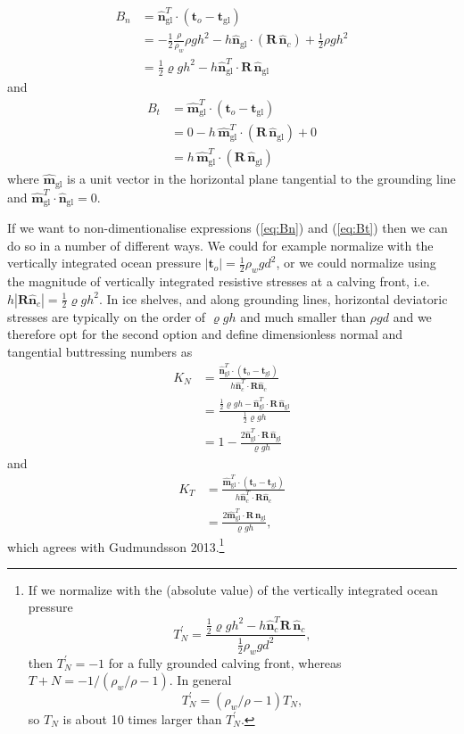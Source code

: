 \documentclass[10pt,a4paper]{book}
\newcommand{\ngl}{\hat{\bm{n}}_{\mathrm{gl}}}
\newcommand{\mgl}{\hat{\bm{m}}_{\mathrm{gl}}}
\newcommand{\normalc}{\hat{\bm{n}}_{c}}
\newcommand{\tgl}{\bm{t}_{\mathrm{gl}}}
\newcommand{\tO}{\bm{t}_o}
\begin{document}
\begin{align}
B_n &= \ngl^T \cdot ( \bm{t}_o - \tgl )\\
&= - \frac{1}{2} \frac{\rho}{\rho_w} \rho g h^2 -  h \ngl \cdot (\bm{R} \, \normalc) + \frac{1}{2} \rho g h^2\\
&=\frac{1}{2} \varrho g h^2 - h \ngl^T \cdot \bm{R} \, \ngl \label{eq:Bn}
\end{align}
and
\begin{align}
B_t &= \mgl^T \cdot ( \bm{t}_o - \tgl )\\
&= 0 -  h\,  \mgl^T \cdot (\bm{R} \, \ngl) + 0\\
&=h \, \mgl^T \cdot (\bm{R} \, \ngl) \label{eq:Bt}
\end{align}
where $\mgl$ is a unit vector in the horizontal plane tangential to
the grounding line and $\mgl^T \cdot \ngl=0$.


If we want to non-dimentionalise expressions (\ref{eq:Bn}) and
(\ref{eq:Bt}) then we can do so in a number of different ways. We
could for example normalize with the vertically integrated ocean
pressure $|\tO|=\frac{1}{2} \rho_w g d^2$, or we could normalize using
the magnitude of vertically integrated resistive stresses at a calving front, i.e.\ $h
|\bm{R} \normalc|=\frac{1}{2} \varrho g h^2$. In ice shelves, and along
grounding lines, horizontal deviatoric stresses are typically on the
order of $\varrho g h$ and much smaller than $\rho g d$ and we
therefore opt for the second option and define dimensionless normal and
tangential buttressing numbers as
\begin{align}
  K_N&=\frac{\ngl^T \cdot (\tO-\tgl)}{h \normalc^T \cdot \bm{R} \normalc} \\
  &=\frac{\frac{1}{2} \varrho g h -  \ngl^T \cdot \bm{R} \, \ngl}{\frac{1}{2} \varrho g h }\\
   &=1- \frac{2 \ngl^T \cdot \bm{R} \, \ngl}{\varrho g h }
\end{align}
and
\begin{align}
  K_T&=\frac{\mgl^T \cdot ( \bm{t}_o - \tgl )}{h \normalc^T \cdot \bm{R} \normalc} \\
     &=\frac{2 \mgl^T \cdot \bm{R} \, \ngl }{\varrho g h} ,
\end{align}
which agrees with Gudmundsson 2013.\footnote{If we normalize with the
  (absolute value) of the vertically integrated ocean pressure
\[
T_N^{'}=\frac{\frac{1}{2} \varrho g h^2 - h \normalc^T \bm{R} \, \normalc}
{\frac{1}{2} \rho_w g d^2  },
\]
then $T_N^{'}=-1$ for a fully grounded calving front, whereas $T+N=-1/(\rho_w/\rho-1)$. In general
\[
T_N^{'}=(\rho_w/\rho-1) T_N,
\]
so $T_N$ is about 10 times larger than $T_N^{'}$.}
\end{document}
